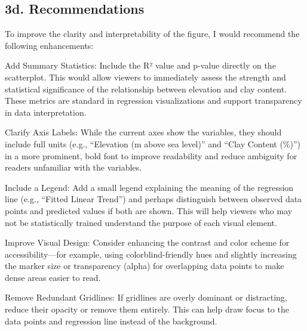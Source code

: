 \documentclass[
]{article}
\begin{document}
\subsection{3d. Recommendations}\label{d.-recommendations}

To improve the clarity and interpretability of the figure, I would
recommend the following enhancements:

Add Summary Statistics: Include the R² value and p-value directly on the
scatterplot. This would allow viewers to immediately assess the strength
and statistical significance of the relationship between elevation and
clay content. These metrics are standard in regression visualizations
and support transparency in data interpretation.

Clarify Axis Labels: While the current axes show the variables, they
should include full units (e.g., ``Elevation (m above sea level)'' and
``Clay Content (\%)'') in a more prominent, bold font to improve
readability and reduce ambiguity for readers unfamiliar with the
variables.

Include a Legend: Add a small legend explaining the meaning of the
regression line (e.g., ``Fitted Linear Trend'') and perhaps distinguish
between observed data points and predicted values if both are shown.
This will help viewers who may not be statistically trained understand
the purpose of each visual element.

Improve Visual Design: Consider enhancing the contrast and color scheme
for accessibility---for example, using colorblind-friendly hues and
slightly increasing the marker size or transparency (alpha) for
overlapping data points to make dense areas easier to read.

Remove Redundant Gridlines: If gridlines are overly dominant or
distracting, reduce their opacity or remove them entirely. This can help
draw focus to the data points and regression line instead of the
background.
\end{document}
